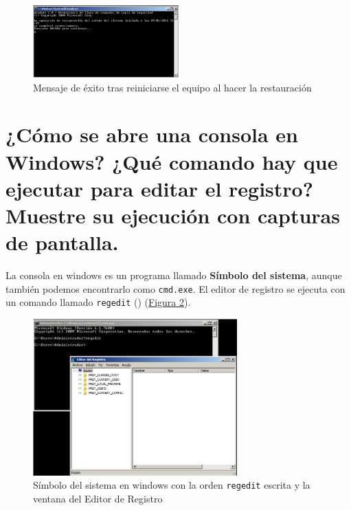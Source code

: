 \documentclass[10pt,a4paper,spanish]{article}
\numberwithin{equation}{section} %
\numberwithin{figure}{section} %
\numberwithin{table}{section} %
\begin{document}
\begin{enumerate}[1.]
    \begin{figure}[!h]
        \centering
        \includegraphics[width=0.5\textwidth]{18}
        \caption{Mensaje de éxito tras reiniciarse el equipo al hacer la restauración}
        \label{exitores}
    \end{figure}

\end{enumerate}

\section{¿Cómo se abre una consola en Windows? ¿Qué comando hay que ejecutar para editar el registro? Muestre su ejecución con capturas de pantalla.}
La consola en windows es un programa llamado \textbf{Símbolo del sistema}, aunque también podemos encontrarlo como \texttt{cmd.exe}. El editor de registro se ejecuta con un comando llamado \texttt{regedit} (\cite{regedit}) (\hyperref[cmd]{Figura \ref*{cmd}}).

\begin{figure}[!h]
    \centering
    \includegraphics[width=0.7\textwidth]{19}
    \caption{Símbolo del sistema en windows con la orden \texttt{regedit} escrita y la ventana del Editor de Registro}
    \label{cmd}
\end{figure}
\end{document}
